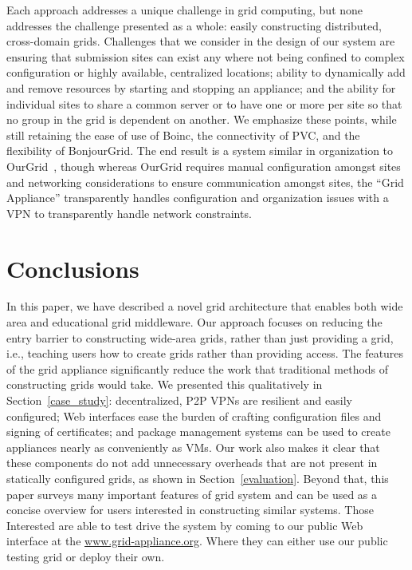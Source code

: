 \documentclass[conference]{IEEEtran}
\begin{document}
Each approach addresses a unique challenge in grid computing, but none
addresses the challenge presented as a whole: easily constructing distributed,
cross-domain grids.  Challenges that we consider in the design of our system
are ensuring that submission sites can exist any where not being confined to
complex configuration or highly available, centralized locations; ability to
dynamically add and remove resources by starting and stopping an appliance; and
the ability for individual sites to share a common server or to have one or
more per site so that no group in the grid is dependent on another.  We
emphasize these points, while still retaining the ease of use of Boinc, the
connectivity of PVC, and the flexibility of BonjourGrid.  The end result is a
system similar in organization to OurGrid~\cite{ourgrid}, though whereas OurGrid
requires manual configuration amongst sites and networking considerations to
ensure communication amongst sites, the ``Grid Appliance'' transparently handles
configuration and organization issues with a VPN to transparently handle network
constraints.

\section{Conclusions}
\label{conclusions}

In this paper, we have described a novel grid architecture that enables both
wide area and educational grid middleware.  Our approach focuses on reducing
the entry barrier to constructing wide-area grids, rather than just providing a
grid, i.e., teaching users how to create grids rather than providing access.
The features of the grid appliance significantly reduce the work that
traditional methods of constructing grids would take.  We presented this
qualitatively in Section~\ref{case_study}:  decentralized, P2P VPNs are
resilient and easily configured; Web interfaces ease the burden of crafting
configuration files and signing of certificates; and package management systems
can be used to create appliances nearly as conveniently as VMs.  Our work also
makes it clear that these components do not add unnecessary overheads that are
not present in statically configured grids, as shown in
Section~\ref{evaluation}.  Beyond that, this paper surveys many important
features of grid system and can be used as a concise overview for users
interested in constructing similar systems.  Those Interested are able to test
drive the system by coming to our public Web interface at the
\url{www.grid-appliance.org}.  Where they can either use our public testing
grid or deploy their own.
\end{document}
